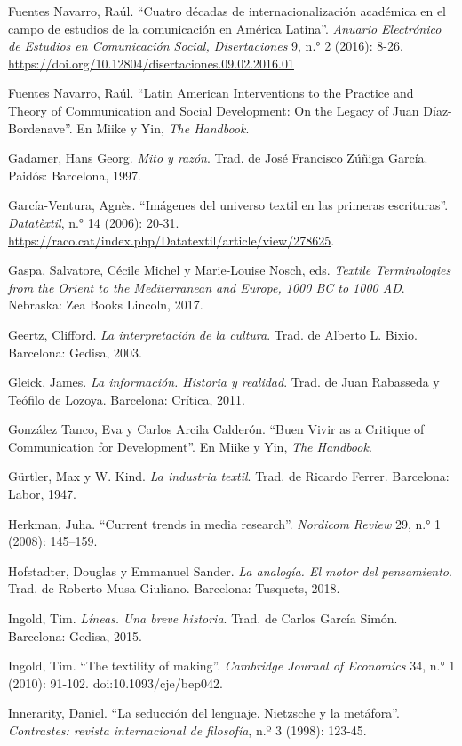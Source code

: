 \documentclass{tufte-handout}
\begin{document}
\begin{hangparas}{.25in}{1}
Fuentes Navarro, Raúl. ``Cuatro décadas de internacionalización
académica en el campo de estudios de la comunicación en América
Latina''. \emph{Anuario Electrónico de Estudios en Comunicación Social,
Disertaciones} 9, n.° 2 (2016): 8-26.
\url{https://doi.org/10.12804/disertaciones.09.02.2016.01}

Fuentes Navarro, Raúl. ``Latin American Interventions to the Practice and Theory of
Communication and Social Development: On the Legacy of Juan
Díaz-Bordenave''. En Miike y Yin, \emph{The Handbook}.

Gadamer, Hans Georg. \emph{Mito y razón}. Trad. de José Francisco Zúñiga
García. Paidós: Barcelona, 1997.

García-Ventura, Agnès. ``Imágenes del universo textil en las primeras
escrituras''. \emph{Datatèxtil}, n.° 14 (2006): 20-31.
\url{https://raco.cat/index.php/Datatextil/article/view/278625}.

Gaspa, Salvatore, Cécile Michel y Marie-Louise Nosch, eds. \emph{Textile
Terminologies from the Orient to the Mediterranean and Europe, 1000 BC
to 1000 AD}. Nebraska: Zea Books Lincoln, 2017.

Geertz, Clifford. \emph{La interpretación de la cultura}. Trad. de
Alberto L. Bixio. Barcelona: Gedisa, 2003.

Gleick, James. \emph{La información. Historia y realidad}. Trad. de Juan
Rabasseda y Teófilo de Lozoya. Barcelona: Crítica, 2011.

González Tanco, Eva y Carlos Arcila Calderón. ``Buen Vivir as a Critique
of Communication for Development''. En Miike y Yin, \emph{The Handbook}.

Gürtler, Max y W. Kind. \emph{La industria textil}. Trad. de Ricardo
Ferrer. Barcelona: Labor, 1947.

Herkman, Juha. ``Current trends in media research''. \emph{Nordicom
Review} 29, n.° 1 (2008): 145--159.

Hofstadter, Douglas y Emmanuel Sander. \emph{La analogía. El motor del
pensamiento}. Trad. de Roberto Musa Giuliano. Barcelona: Tusquets, 2018.

Ingold, Tim. \emph{Líneas.} \emph{Una breve historia}. Trad. de Carlos
García Simón. Barcelona: Gedisa, 2015.

Ingold, Tim. ``The textility of making''. \emph{Cambridge Journal of
Economics} 34, n.° 1 (2010): 91-102. doi:10.1093/cje/bep042.

Innerarity, Daniel. ``La seducción del lenguaje. Nietzsche y la
metáfora''. \emph{Contrastes: revista internacional de filosofía}, n.º 3
(1998): 123-45.


\end{hangparas}
\end{document}
